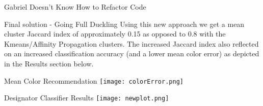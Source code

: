 \documentclass{beamer}
\begin{document}
\begin{frame}{\centerline{\Huge Gabriel Doesn't Know How to Refactor Code}}
\begin{textblock}{5}
\begin{block}{Final solution - Going Full Duckling}
Using this new approach we get a mean cluster Jaccard index of approximately 0.15 as opposed to 0.8 with the
Kmeans/Affinity Propagation clusters. The increased Jaccard index also reflected on an increased classification accuracy
(and a lower mean color error) as depicted in the Results section below.

\end{block}
\begin{block}{Mean Color Recommendation}
\texttt{[image: colorError.png]}
\end{block}
\begin{block}{Designator Classifier Results}
\texttt{[image: newplot.png]}
\end{block}
\end{textblock}
\end{frame}
\end{document}

